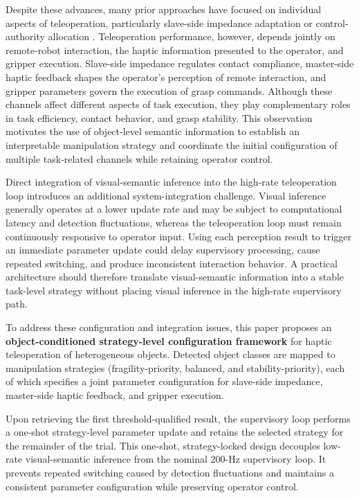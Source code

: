 Despite these advances, many prior approaches have focused on individual aspects of teleoperation, particularly slave-side impedance adaptation or control-authority allocation \cite{ref06,ref07,ref08,ref09,ref12,ref15,ref16,ref18,ref19,ref20,ref21}. Teleoperation performance, however, depends jointly on remote-robot interaction, the haptic information presented to the operator, and gripper execution. Slave-side impedance regulates contact compliance, master-side haptic feedback shapes the operator's perception of remote interaction, and gripper parameters govern the execution of grasp commands. Although these channels affect different aspects of task execution, they play complementary roles in task efficiency, contact behavior, and grasp stability. This observation motivates the use of object-level semantic information to establish an interpretable manipulation strategy and coordinate the initial configuration of multiple task-related channels while retaining operator control.

Direct integration of visual-semantic inference into the high-rate teleoperation loop introduces an additional system-integration challenge. Visual inference generally operates at a lower update rate and may be subject to computational latency and detection fluctuations, whereas the teleoperation loop must remain continuously responsive to operator input. Using each perception result to trigger an immediate parameter update could delay supervisory processing, cause repeated switching, and produce inconsistent interaction behavior. A practical architecture should therefore translate visual-semantic information into a stable task-level strategy without placing visual inference in the high-rate supervisory path.

To address these configuration and integration issues, this paper proposes an \textbf{object-conditioned strategy-level configuration framework} for haptic teleoperation of heterogeneous objects. Detected object classes are mapped to manipulation strategies (fragility-priority, balanced, and stability-priority), each of which specifies a joint parameter configuration for slave-side impedance, master-side haptic feedback, and gripper execution.

Upon retrieving the first threshold-qualified result, the supervisory loop performs a one-shot strategy-level parameter update and retains the selected strategy for the remainder of the trial. This one-shot, strategy-locked design decouples low-rate visual-semantic inference from the nominal 200-Hz supervisory loop. It prevents repeated switching caused by detection fluctuations and maintains a consistent parameter configuration while preserving operator control.

